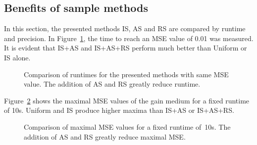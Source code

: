 \subsection{Benefits of sample methods}
In this section, the presented methods IS, AS and RS are compared by runtime
and precision.
In Figure~\ref{graphic:methods_compare}, the time to reach an
MSE value of 0.01 was measured. It is evident that IS+AS and IS+AS+RS perform
much better than Uniform or IS alone. 
\begin{figure}[H]
  \centerline{
    }
  \caption{Comparison of runtimes for the presented methods with same
    MSE value.  The addition of AS and RS greatly reduce runtime.}
  \label{graphic:methods_compare}
\end{figure}
Figure~\ref{graphic:methods_compare2} shows the maximal MSE values
of the gain medium for a fixed runtime of 10s. Uniform and IS 
produce higher maxima than IS+AS or IS+AS+RS.
\begin{figure}[H]
  \centerline{
    }
  \caption{Comparison of maximal MSE values for a fixed runtime of~10s. 
    The addition of AS and RS greatly reduce maximal MSE.}
  \label{graphic:methods_compare2}
\end{figure}
